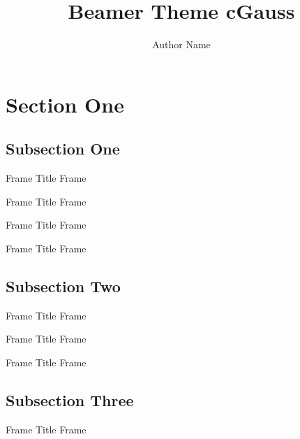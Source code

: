 \documentclass[14pt,xcolor={rgb}]{beamer}
\begin{document}
\title{Beamer Theme cGauss}
\author{Author Name}

\begin{frame}[plain]
\titlepage
\end{frame}

\section{Section One}

\subsection{Subsection One}

\begin{frame}{Frame Title}
Frame \insertframenumber
\end{frame}

\begin{frame}{Frame Title}
Frame \insertframenumber
\end{frame}

\begin{frame}{Frame Title}
Frame \insertframenumber
\end{frame}

\begin{frame}{Frame Title}
Frame \insertframenumber
\end{frame}

\subsection{Subsection Two}

\begin{frame}{Frame Title}
Frame \insertframenumber
\end{frame}

\begin{frame}{Frame Title}
Frame \insertframenumber
\end{frame}

\begin{frame}{Frame Title}
Frame \insertframenumber
\end{frame}

\subsection{Subsection Three}

\begin{frame}{Frame Title}
Frame \insertframenumber
\end{frame}
\end{document}
